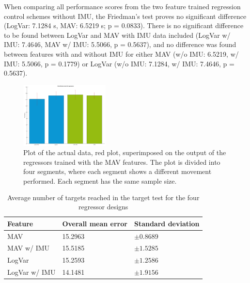 	When comparing all performance scores from the two feature trained regression control schemes without IMU, the Friedman's test proves no significant difference (LogVar: 7.1284 s, MAV: 6.5219 s; p = 0.0833). There is no significant difference to be found between LogVar and MAV with IMU data included (LogVar w/ IMU: 7.4646, MAV w/ IMU: 5.5066, p = 0.5637), and no difference was found between features with and without IMU for either MAV (w/o IMU: 6.5219, w/ IMU: 5.5066, p = 0.1779) or LogVar (w/o IMU: 7.1284, w/ IMU: 7.4646, p = 0.5637).
	
	\begin{figure}[!thpb]
		\centering
		\includegraphics[width=0.4\textwidth]{figures/sumMoreBarsWithTargetsReachedForAllRegressors}  %
		\caption{Plot of the actual data, red plot, superimposed on the output of the regressors trained with the MAV features. The plot is divided into four segments, where each segment shows a different movement performed. Each segment has the same sample size.}
		\label{fig:TargetScoresTargets}  %
	\end{figure}	
	
	\begin{table}[!thpb]
		\begin{center}
			\begin{tabular}{l l l}
				\hline
				\textbf{Feature} & \textbf{Overall mean error} & \textbf{Standard deviation}\\
				\hline
				MAV & 15.2963 & $\pm 0.8689$ \\
				MAV w/ IMU & 15.5185 & $\pm 1.5285$ \\
				LogVar & 15.2593 & $\pm 1.2586$ \\
				LogVar w/ IMU & 14.1481 & $\pm 1.9156$ \\
				\hline
			\end{tabular}
			\caption{Average number of targets reached in the target test for the four regressor designs}
		\end{center}
	\end{table}
	
